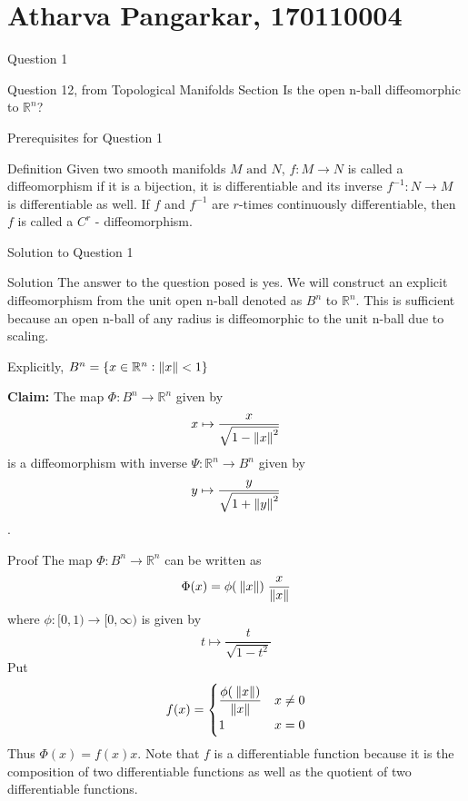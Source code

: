 \documentclass{beamer}
\newcommand{\R}{\mathbb{R}}
\begin{document}
\section{Atharva Pangarkar, 170110004}
\begin{frame}{Question 1}
\begin{block}{Question 12, from Topological Manifolds Section}
Is the open n-ball diffeomorphic to $\R^n$? 
\end{block}

\end{frame}
\begin{frame}{Prerequisites for Question 1}
\begin{block}{Definition}
Given two smooth manifolds $M \text{ and } N$, $f: M \to N$ is called a diffeomorphism if it is a bijection, it is differentiable and its inverse $f^{-1}:N \to M$ is differentiable as well. If $f$ and $f^{-1}$ are $r$-times continuously differentiable, then $f$ is called a $C^r$ - diffeomorphism. 
\end{block} 
    
\end{frame}
\begin{frame}{Solution to Question 1}
\begin{block}{Solution}
The answer to the question posed is \alert{yes}. We will construct an explicit diffeomorphism from the unit open n-ball denoted as $B^n$ to $\R^n$. This is sufficient because an open n-ball of any radius is diffeomorphic to the unit n-ball due to scaling.

Explicitly, $B^n = \{x \in \R^n: \norm{x} < 1\}$

\textbf{Claim:} The map $\Phi: B^n \to \R^n$ given by \[ x \mapsto \dfrac{x}{\sqrt{1-{\norm{x}}^2}} \] is a diffeomorphism with inverse $\Psi:\R^n \to B^n$ given by \[y \mapsto \dfrac{y}{\sqrt{1+{\norm{y}}^2}} \]. 
\end{block}

\end{frame}

\begin{frame}
\begin{block}{Proof}
The map $\Phi: B^n \to \R^n$ can be written as \[\Phi(x) = \phi(\:\norm{x})\; \dfrac{x}{\norm{x}}\] 
where $\phi:[0,1) \to [0, \infty)$ is given by \[t \mapsto \dfrac{t}{\sqrt{1-t^2}} \]
Put \[ f(x) = \begin{cases}
 \dfrac{\phi(\:\norm{x})}{\norm{x}} & x \neq 0 \\
1 & x = 0 
\end{cases}\] Thus $\Phi(x) = f(x)x$. Note that $f$ is a differentiable function because it is the composition of two differentiable functions as well as the quotient of two differentiable functions. 
\end{block} 
\end{frame}
\end{document}
